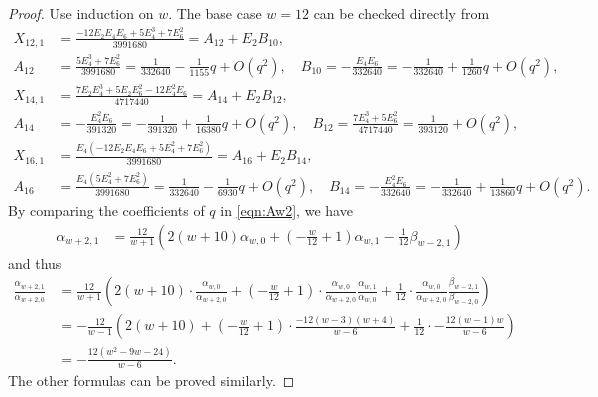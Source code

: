 \documentclass[10pt,reqno]{amsproc}
\newcommand{\1}{\mathds{1}}	%
\theoremstyle{definition}
\theoremstyle{remark}
\begin{document}
\begin{proof}
    Use induction on $w$.
    The base case $w = 12$ can be checked directly from
    \begin{align*}
        X_{12,1} &= \frac{-12 E_2 E_4 E_6 + 5E_4^3 + 7E_6^2}{3991680} = A_{12} + E_2 B_{10}, \\
        A_{12} &= \frac{5 E_4^3 + 7 E_6^2}{3991680} = \frac{1}{332640} - \frac{1}{1155}q + O(q^2), \quad B_{10} = -\frac{E_4 E_6}{332640} = -\frac{1}{332640} + \frac{1}{1260} q + O(q^2), \\
        X_{14, 1} &= \frac{7 E_2 E_4^3 + 5 E_2 E_6^2 - 12 E_4^2 E_6}{4717440} = A_{14} + E_2 B_{12}, \\
        A_{14} &= -\frac{E_4^2 E_6}{391320} = - \frac{1}{391320} + \frac{1}{16380} q + O(q^2), \quad B_{12} = \frac{7 E_4^3 + 5 E_6^2}{4717440} = \frac{1}{393120} + O(q^2), \\
        X_{16, 1} &= \frac{E_4 (-12 E_2 E_4 E_6 + 5 E_4^2 + 7 E_6^2)}{3991680} = A_{16} + E_2 B_{14}, \\
        A_{16} &= \frac{E_4 (5 E_4^2 + 7 E_6^2)}{3991680} = \frac{1}{332640} - \frac{1}{6930} q + O(q^2), \quad B_{14} = -\frac{E_4^2 E_6}{332640} = -\frac{1}{332640} + \frac{1}{13860} q + O(q^2).
    \end{align*}
    By comparing the coefficients of $q$ in \eqref{eqn:Aw2}, we have
    \begin{align*}
        \alpha_{w+2,1} &= \frac{12}{w+1} \left(2(w+10) \alpha_{w,0} + \left(-\frac{w}{12}+1\right)\alpha_{w,1} - \frac{1}{12} \beta_{w-2,1}\right)
    \end{align*}
    and thus
    \begin{align*}
        \frac{\alpha_{w+2,1}}{\alpha_{w+2,0}} &= \frac{12}{w+1} \left(2(w+10) \cdot \frac{\alpha_{w,0}}{\alpha_{w+2,0}} + \left(-\frac{w}{12}+1\right) \cdot \frac{\alpha_{w,0}}{\alpha_{w+2,0}} \frac{\alpha_{w,1}}{\alpha_{w,0}} + \frac{1}{12} \cdot \frac{\alpha_{w,0}}{\alpha_{w+2,0}} \frac{\beta_{w-2,1}}{\beta_{w-2,0}}\right) \\
        &= -\frac{12}{w-1} \left(2(w+10) + \left(-\frac{w}{12} + 1\right) \cdot \frac{-12(w-3)(w+4)}{w-6} + \frac{1}{12} \cdot -\frac{12(w-1)w}{w-6}\right) \\
        &= - \frac{12(w^2 - 9w - 24)}{w-6}.
    \end{align*}
    The other formulas can be proved similarly.
\end{proof}
\end{document}
